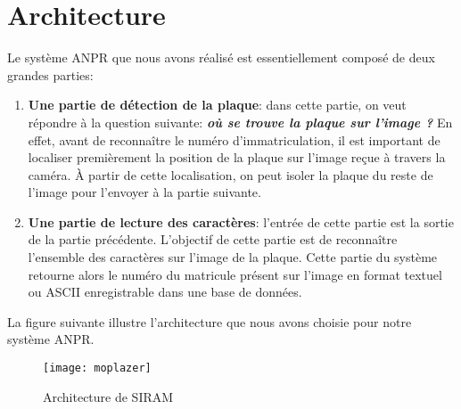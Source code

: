\section{Architecture}
Le système ANPR que nous avons réalisé est essentiellement composé de deux grandes parties:
    \begin{enumerate}
        \item \textbf{Une partie de détection de la plaque}: dans cette partie, on veut répondre à la question suivante: \textbf{\textit{où se trouve la plaque sur l'image ?}} En effet, avant de reconnaître le numéro d'immatriculation, il est important de localiser premièrement la position de la plaque sur l'image reçue à travers la caméra. À partir de cette localisation, on peut isoler la plaque du reste de l'image pour l'envoyer à la partie suivante.
        \item \textbf{Une partie de lecture des caractères}: l'entrée de cette partie est la sortie de la partie précédente. L'objectif de cette partie est de reconnaître l'ensemble des caractères sur l'image de la plaque. Cette partie du système retourne alors le numéro du matricule présent sur l'image en format textuel ou ASCII enregistrable dans une base de données.
    \end{enumerate}
    La figure suivante illustre l'architecture que nous avons choisie pour notre système ANPR.
    \begin{figure}[H]
        \texttt{[image: moplazer]}
        \caption{Architecture de SIRAM}
    \end{figure}